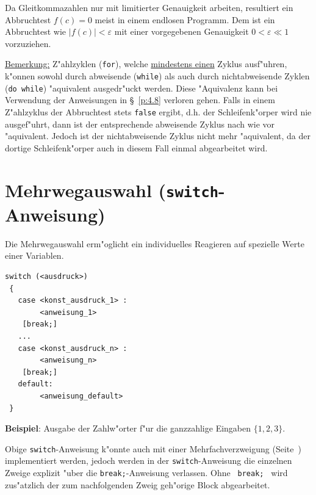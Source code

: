 Da Gleitkommazahlen nur mit limitierter Genauigkeit
arbeiten, resultiert
ein Abbruchtest $f(c) = 0$ meist in einem endlosen Programm.
Dem ist ein Abbruchtest wie $|f(c)| < \varepsilon$ mit einer
vorgegebenen Genauigkeit $0< \varepsilon \ll 1$ vorzuziehen.

\underline{Bemerkung:}
Z"ahlzyklen (\verb|for|), welche \underline{mindestens einen} Zyklus
ausf"uhren, k"onnen sowohl durch abweisende (\verb|while|)
als auch durch nichtabweisende Zyklen (\verb|do while|)
"aquivalent ausgedr"uckt werden.
Diese "Aquivalenz kann bei Verwendung der Anweisungen in \S~\ref{p:4.8}
verloren gehen.
Falls in einem Z"ahlzyklus der Abbruchtest stets \texttt{false} ergibt, d.h.
der Schleifenk"orper wird nie ausgef"uhrt, dann ist
der entsprechende abweisende Zyklus nach wie vor "aquivalent. Jedoch
ist der nichtabweisende Zyklus nicht mehr "aquivalent, da der dortige
Schleifenk"orper auch in diesem Fall einmal abgearbeitet wird.
%
%
%
\section{Mehrwegauswahl (\texttt{switch}-Anweisung)}
\label{p:4.7}
%
Die Mehrwegauswahl erm"oglicht ein individuelles Reagieren
auf spezielle Werte einer Variablen.

\mbox{}\hfill
\begin{minipage}[t]{0.6\textwidth}
\begin{verbatim}
switch (<ausdruck>)
 {
   case <konst_ausdruck_1> :
        <anweisung_1>
	[break;]
   ...
   case <konst_ausdruck_n> :
        <anweisung_n>
	[break;]
   default:
        <anweisung_default>
 }
\end{verbatim}
\end{minipage}
\hfill\mbox{}

\textbf{Beispiel}: Ausgabe der Zahlw"orter f"ur die ganzzahlige Eingaben
	$\{1,2,3\}$.
%

Obige \verb|switch|-Anweisung k"onnte auch mit einer
Mehrfachverzweigung (Seite~\pageref{mehrweg}) implementiert werden,
jedoch werden in der \verb|switch|-Anweisung die einzelnen Zweige
explizit "uber die  \verb|break;|-Anweisung verlassen.
Ohne \verb| break; | wird zus"atzlich der zum nachfolgenden Zweig
geh"orige Block abgearbeitet.

